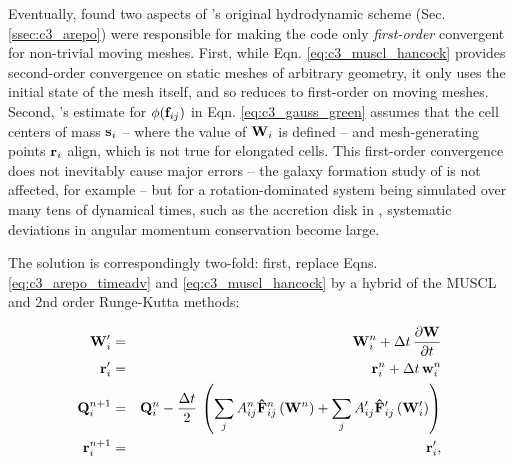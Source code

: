 
Eventually, \cite{pakm+16} found two aspects of \arepo's original hydrodynamic scheme (Sec. \ref{ssec:c3_arepo}) were responsible for making the code only \textit{first-order} convergent for non-trivial moving meshes.  First, while Eqn. \ref{eq:c3_muscl_hancock} provides second-order convergence on static meshes of arbitrary geometry, it only uses the initial state of the mesh itself, and so reduces to first-order on moving meshes.  Second, \arepo's estimate for $\phi({\bf f}_{ij})$ in Eqn. \ref{eq:c3_gauss_green} assumes that the cell centers of mass ${\bf s}_i$ -- where the value of ${\bf W}_i$ is defined -- and mesh-generating points ${\bf r}_i$ align, which is not true for elongated cells.  This first-order convergence does not inevitably cause major errors -- the galaxy formation study of \cite{marips14} is not affected, for example -- but for a rotation-dominated system being simulated over many tens of dynamical times, such as the accretion disk in \cite{pakm+16}, systematic deviations in angular momentum conservation become large.

The solution is correspondingly two-fold: first, replace Eqns. \ref{eq:c3_arepo_timeadv} and \ref{eq:c3_muscl_hancock} by a hybrid of the MUSCL and 2nd order Runge-Kutta methods:

\begin{eqnarray}
{\bf W}^\prime_i &=& {\bf W}^n_i + \Delta t \, \frac{\partial {\bf W}}{\partial t} \nonumber \\
{\bf r}_i^\prime &=& {\bf r}_i^n +  \Delta t \, {\bf w}_i^n \nonumber \\
{\bf Q}^{n+1}_i &=& {\bf Q}^n_i - \frac{\Delta t}{2} \, \left( \sum_j A^n_{ij} {\bf \hat{F}}_{ij}^{n} \left( {\bf W}^n \right) + \sum_j A^\prime_{ij} {\bf \hat{F}}_{ij}^{\prime} \left( {\bf W}_i^\prime \right) \right) \nonumber \\
{\bf r}_i^{n+1} &=& {\bf r}_i^\prime,
\label{eq:c3_rk2_timeevo}
\end{eqnarray}

